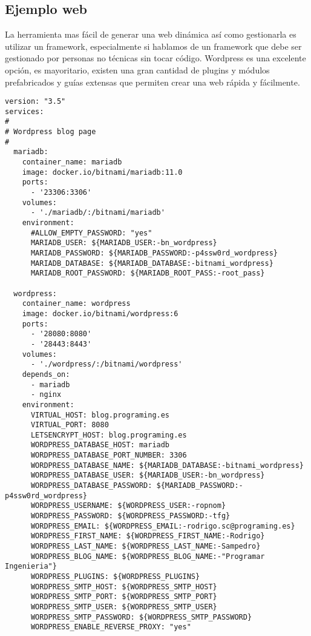 \subsection{Ejemplo web}
La herramienta mas fácil de generar una web dinámica así como gestionarla es utilizar un framework, especialmente si hablamos de un framework que debe ser gestionado por personas no técnicas sin tocar código. Wordpress es una excelente opción, es mayoritario, existen una gran cantidad de plugins y módulos prefabricados y guías extensas que permiten crear una web rápida y fácilmente.

\begin{lstlisting}[style=yaml, caption={docker-compose.yml Wordpress prueba de concepto.}, label={lst:wordpress} ]
version: "3.5"
services:
#
# Wordpress blog page
#
  mariadb:
    container_name: mariadb
    image: docker.io/bitnami/mariadb:11.0
    ports:
      - '23306:3306'
    volumes:
      - './mariadb/:/bitnami/mariadb'
    environment:
      #ALLOW_EMPTY_PASSWORD: "yes"
      MARIADB_USER: ${MARIADB_USER:-bn_wordpress}
      MARIADB_PASSWORD: ${MARIADB_PASSWORD:-p4ssw0rd_wordpress}
      MARIADB_DATABASE: ${MARIADB_DATABASE:-bitnami_wordpress}
      MARIADB_ROOT_PASSWORD: ${MARIADB_ROOT_PASS:-root_pass}
      
  wordpress:
    container_name: wordpress
    image: docker.io/bitnami/wordpress:6
    ports:
      - '28080:8080'
      - '28443:8443'
    volumes:
      - './wordpress/:/bitnami/wordpress'
    depends_on:
      - mariadb
      - nginx
    environment:
      VIRTUAL_HOST: blog.programing.es
      VIRTUAL_PORT: 8080
      LETSENCRYPT_HOST: blog.programing.es
      WORDPRESS_DATABASE_HOST: mariadb
      WORDPRESS_DATABASE_PORT_NUMBER: 3306
      WORDPRESS_DATABASE_NAME: ${MARIADB_DATABASE:-bitnami_wordpress}
      WORDPRESS_DATABASE_USER: ${MARIADB_USER:-bn_wordpress}
      WORDPRESS_DATABASE_PASSWORD: ${MARIADB_PASSWORD:-p4ssw0rd_wordpress}
      WORDPRESS_USERNAME: ${WORDPRESS_USER:-ropnom}
      WORDPRESS_PASSWORD: ${WORDPRESS_PASSWORD:-tfg}
      WORDPRESS_EMAIL: ${WORDPRESS_EMAIL:-rodrigo.sc@programing.es}
      WORDPRESS_FIRST_NAME: ${WORDPRESS_FIRST_NAME:-Rodrigo}
      WORDPRESS_LAST_NAME: ${WORDPRESS_LAST_NAME:-Sampedro}
      WORDPRESS_BLOG_NAME: ${WORDPRESS_BLOG_NAME:-"Programar Ingenieria"}
      WORDPRESS_PLUGINS: ${WORDPRESS_PLUGINS}
      WORDPRESS_SMTP_HOST: ${WORDPRESS_SMTP_HOST}
      WORDPRESS_SMTP_PORT: ${WORDPRESS_SMTP_PORT}
      WORDPRESS_SMTP_USER: ${WORDPRESS_SMTP_USER}
      WORDPRESS_SMTP_PASSWORD: ${WORDPRESS_SMTP_PASSWORD}
      WORDPRESS_ENABLE_REVERSE_PROXY: "yes"
\end{lstlisting}

